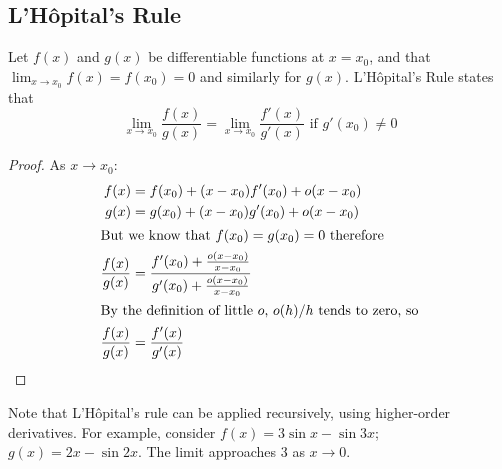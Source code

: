 \subsection{L'H\^opital's Rule}
Let \(f(x)\) and \(g(x)\) be differentiable functions at \(x=x_0\), and that \(\lim_{x\to x_0} f(x) = f(x_0) = 0\) and similarly for \(g(x)\). L'H\^opital's Rule states that
\[ \lim_{x\to x_0} \frac{f(x)}{g(x)} = \lim_{x\to x_0} \frac{f'(x)}{g'(x)} \text{ if } g'(x_0) \neq 0 \]
\begin{proof}
	As \(x \to x_0\):
	\begin{align*}
		f(x)              & = f(x_0) + (x-x_0) f'(x_0) + o(x-x_0)                                       \\
		g(x)              & = g(x_0) + (x-x_0) g'(x_0) + o(x-x_0)                                       \\
		\intertext{But we know that \(f(x_0)=g(x_0)=0\) therefore}
		\frac{f(x)}{g(x)} & = \frac{f'(x_0) + \frac{o(x-x_0)}{x-x_0}}{g'(x_0) + \frac{o(x-x_0)}{x-x_0}} \\
		\intertext{By the definition of little \(o\), \(o(h)/h\) tends to zero, so}
		\frac{f(x)}{g(x)} & = \frac{f'(x)}{g'(x)}
	\end{align*}
\end{proof}
Note that L'H\^opital's rule can be applied recursively, using higher-order derivatives. For example, consider \(f(x) = 3\sin x - \sin 3x\); \(g(x) = 2x - \sin 2x\). The limit approaches 3 as \(x \to 0\).
